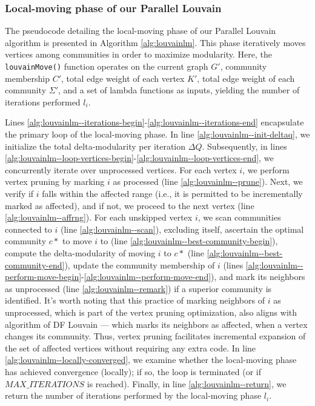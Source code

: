 \subsubsection{Local-moving phase of our Parallel Louvain}

The pseudocode detailing the local-moving phase of our Parallel Louvain algorithm is presented in Algorithm \ref{alg:louvainlm}. This phase iteratively moves vertices among communities in order to maximize modularity. Here, the \texttt{louvainMove()} function operates on the current graph $G'$, community membership $C'$, total edge weight of each vertex $K'$, total edge weight of each community $\Sigma'$, and a set of lambda functions as inputs, yielding the number of iterations performed $l_i$.



Lines \ref{alg:louvainlm--iterations-begin}-\ref{alg:louvainlm--iterations-end} encapsulate the primary loop of the local-moving phase. In line \ref{alg:louvainlm--init-deltaq}, we initialize the total delta-modularity per iteration $\Delta Q$. Subsequently, in lines \ref{alg:louvainlm--loop-vertices-begin}-\ref{alg:louvainlm--loop-vertices-end}, we concurrently iterate over unprocessed vertices. For each vertex $i$, we perform vertex pruning by marking $i$ as processed (line \ref{alg:louvainlm--prune}). Next, we verify if $i$ falls within the affected range (i.e., it is permitted to be incrementally marked as affected), and if not, we proceed to the next vertex (line \ref{alg:louvainlm--affrng}). For each unskipped vertex $i$, we scan communities connected to $i$ (line \ref{alg:louvainlm--scan}), excluding itself, ascertain the optimal community $c*$ to move $i$ to (line \ref{alg:louvainlm--best-community-begin}), compute the delta-modularity of moving $i$ to $c*$ (line \ref{alg:louvainlm--best-community-end}), update the community membership of $i$ (lines \ref{alg:louvainlm--perform-move-begin}-\ref{alg:louvainlm--perform-move-end}), and mark its neighbors as unprocessed (line \ref{alg:louvainlm--remark}) if a superior community is identified. It's worth noting that this practice of marking neighbors of $i$ as unprocessed, which is part of the vertex pruning optimization, also aligns with algorithm of DF Louvain --- which marks its neighbors as affected, when a vertex changes its community. Thus, vertex pruning facilitates incremental expansion of the set of affected vertices without requiring any extra code. In line \ref{alg:louvainlm--locally-converged}, we examine whether the local-moving phase has achieved convergence (locally); if so, the loop is terminated (or if $MAX\_ITERATIONS$ is reached). Finally, in line \ref{alg:louvainlm--return}, we return the number of iterations performed by the local-moving phase $l_i$.


